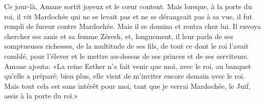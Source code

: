 Ce jour-là, Amane sortit joyeux et le cœur content.
Mais lorsque, à la porte du roi, il vit Mardochée
		qui ne se levait pas et ne se dérangeait pas à sa vue,
	il fut rempli de fureur contre Mardochée.
	Mais il se domina et rentra chez lui.
Il envoya chercher ses amis et sa femme Zéresh,
	et, longuement, il leur parla de ses somptueuses richesses,
	de la multitude de ses fils, de tout ce dont le roi l’avait comblé,
	pour l’élever et le mettre au-dessus de ses princes et de ses serviteurs.
Amane ajouta: «La reine Esther n’a fait venir que moi, avec le roi,
	au banquet qu’elle a préparé;
	bien plus, elle vient de m’inviter encore demain avec le roi.
Mais tout cela est sans intérêt pour moi,
	tant que je verrai Mardochée, le Juif, assis à la porte du roi.»
